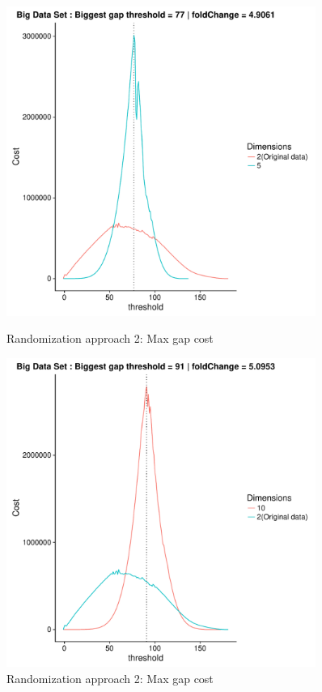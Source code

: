 \documentclass[a4paper,10pt]{article}
\theoremstyle{plain}
\theoremstyle{definition}
\begin{document}
\begin{figure}[H]
	\centering
	\begin{minipage}{0.75\textwidth}
		\centering
		\includegraphics[width=0.9\textwidth]{./plots/plotsCostAndSimAp234/plotBigDataCostAndSim-AP2-S7-K5.pdf}
		\caption{Randomization approach 2: Max gap cost}
		\label{fig:maxGapCostBigDataAp2K5}
	\end{minipage}
	\begin{minipage}{0.75\textwidth}
		\centering
		\includegraphics[width=0.9\textwidth]{./plots/plotsCostAndSimAp234/plotBigDataCostAndSim-AP2-S7-K10.pdf}
		\caption{Randomization approach 2: Max gap cost}
		\label{fig:maxGapCostBigDataAp2K10}
	\end{minipage}
\end{figure}
\end{document}
